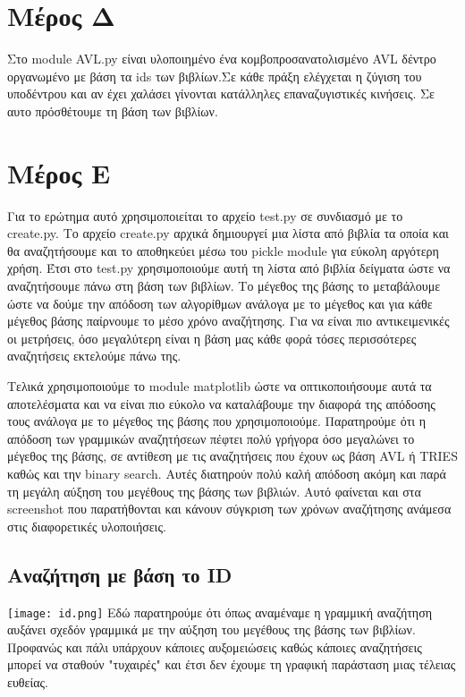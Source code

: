 \documentclass[a4paper]{article}
\begin{document}
\section{Μέρος Δ}
Στο module AVL.py είναι υλοποιημένο ένα κομβοπροσανατολισμένο AVL δέντρο οργανωμένο με βάση τα ids των βιβλίων.Σε κάθε πράξη ελέγχεται η ζύγιση του υποδέντρου και αν έχει χαλάσει γίνονται κατάλληλες επαναζυγιστικές κινήσεις. Σε αυτο πρόσθέτουμε τη βάση των βιβλίων.

\section{Μέρος Ε}
Για το ερώτημα αυτό χρησιμοποιείται το αρχείο test.py σε συνδιασμό με το create.py. Το αρχείο create.py αρχικά δημιουργεί μια λίστα από βιβλία τα οποία και θα αναζητήσουμε και το αποθηκεύει μέσω του pickle module για εύκολη αργότερη χρήση.
Έτσι στο test.py χρησιμοποιούμε αυτή τη λίστα από βιβλία δείγματα ώστε να αναζητήσουμε πάνω στη βάση των βιβλίων. Το μέγεθος της βάσης το μεταβάλουμε ώστε να δούμε την απόδοση των αλγορίθμων ανάλογα με το μέγεθος και για κάθε μέγεθος βάσης παίρνουμε το μέσο χρόνο αναζήτησης.
Για να είναι πιο αντικειμενικές οι μετρήσεις, όσο μεγαλύτερη είναι η βάση μας κάθε φορά τόσες περισσότερες αναζητήσεις εκτελούμε πάνω της.

Τελικά χρησιμοποιούμε το module matplotlib ώστε να οπτικοποιήσουμε αυτά τα αποτελέσματα και να είναι πιο εύκολο να καταλάβουμε την διαφορά της απόδοσης τους ανάλογα με το μέγεθος της βάσης που χρησιμοποιούμε.
Παρατηρούμε ότι η απόδοση των γραμμικών αναζητήσεων πέφτει πολύ γρήγορα όσο μεγαλώνει το μέγεθος της βάσης, σε αντίθεση με τις αναζητήσεις που έχουν ως βάση AVL ή TRIES καθώς και την binary search. Αυτές διατηρούν πολύ καλή απόδοση ακόμη και παρά τη μεγάλη αύξηση του μεγέθους της βάσης των βιβλιών. Αυτό φαίνεται και στα screenshot που παρατήθονται και κάνουν σύγκριση των χρόνων αναζήτησης ανάμεσα στις διαφορετικές υλοποιήσεις.

\subsection{Αναζήτηση με βάση το ID}
\texttt{[image: id.png]}
Εδώ παρατηρούμε ότι όπως αναμέναμε η γραμμική αναζήτηση αυξάνει σχεδόν γραμμικά με την αύξηση του μεγέθους της βάσης των βιβλίων. Προφανώς και πάλι υπάρχουν κάποιες αυξομειώσεις καθώς κάποιες αναζητήσεις μπορεί να σταθούν "τυχαιρές" και έτσι δεν έχουμε τη γραφική παράσταση μιας τέλειας ευθείας.
\end{document}
